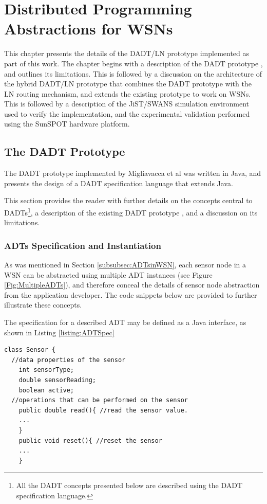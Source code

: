 \chapter{Distributed Programming Abstractions for WSNs} \label{chap:Implementation}
\label{chap:Implementation}

This chapter presents the details of the DADT/LN prototype implemented as part of
this work. The chapter begins with a description of the DADT prototype
\cite{migliavacca_DADT:2006}, and outlines its limitations. This is followed by a
discussion on the architecture of the hybrid DADT/LN prototype that combines the
DADT prototype with the LN routing mechanism, and extends the existing prototype
to work on WSNs. This is followed by a description of the JiST/SWANS simulation
environment used to verify the implementation, and the experimental validation
performed using the SunSPOT hardware platform.

\section {The DADT Prototype}

The DADT prototype implemented by Migliavacca et al \cite{migliavacca_DADT:2006} was written in Java, and presents the design of a DADT specification language that extends Java.

This section provides the reader with
further details on the concepts central to DADTs\footnote{All the DADT concepts presented below
are described using the DADT specification language.}, a description of the
existing DADT prototype \cite{migliavacca_DADT:2006}, and a discussion on its limitations.

\subsection{ADTs Specification and Instantiation} \label{subsec:ADTSpecInst}

As was mentioned in Section \ref{subsubsec:ADTsinWSN}, each sensor node
in a WSN can be abstracted using multiple ADT instances (see
Figure \ref{Fig:MultipleADTs}), and therefore conceal the details of sensor
node abstraction from the application developer. The code snippets below are
provided to further illustrate these concepts.

The specification for a described ADT may be defined as a Java
interface, as shown in Listing \ref{listing:ADTSpec}

\begin{lstlisting}[frame=trbl, basewidth={0.55em, 0.6em}, captionpos=b,
basicstyle=\ttfamily\footnotesize, breaklines, caption = Sensor ADT instances, label =
listing:ADTSpec]
class Sensor {
  //data properties of the sensor 
    int sensorType;
    double sensorReading;
    boolean active; 
  //operations that can be performed on the sensor  
    public double read(){ //read the sensor value.
    ...
    } 
    public void reset(){ //reset the sensor
    ...
    }    
\end{lstlisting}

